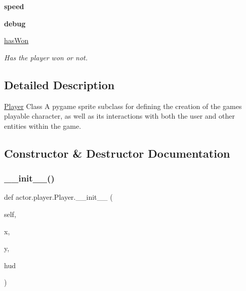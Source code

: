 \begin{DoxyCompactItemize}
\mbox{\label{classactor_1_1player_1_1_player_a303bd9cebacff3d0c25b359e18d7bb3a}} 
{\bfseries speed}
\item 
\mbox{\label{classactor_1_1player_1_1_player_a5cf8c2343817f5fdf357579fc078b677}} 
{\bfseries debug}
\item 
\mbox{\label{classactor_1_1player_1_1_player_aa3b90c5623839511cd22f4e0ee1745ea}} 
\hyperlink{classactor_1_1player_1_1_player_aa3b90c5623839511cd22f4e0ee1745ea}{has\+Won}
\begin{DoxyCompactList}\small\item\em Has the player won or not. \end{DoxyCompactList}\end{DoxyCompactItemize}


\subsection{Detailed Description}
\hyperlink{classactor_1_1player_1_1_player}{Player} Class  A pygame sprite subclass for defining the creation of the game\textquotesingle{}s playable character, as well as its interactions with both the user and other entities within the game. 

\subsection{Constructor \& Destructor Documentation}
\mbox{\label{classactor_1_1player_1_1_player_ab706da8ac6c2ddecb694069c9c55485b}} 
\subsubsection{\texorpdfstring{\+\_\+\+\_\+init\+\_\+\+\_\+()}{\_\_init\_\_()}}
{\footnotesize\ttfamily def actor.\+player.\+Player.\+\_\+\+\_\+init\+\_\+\+\_\+ (\begin{DoxyParamCaption}\item[{}]{self,  }\item[{}]{x,  }\item[{}]{y,  }\item[{}]{hud }\end{DoxyParamCaption})}



